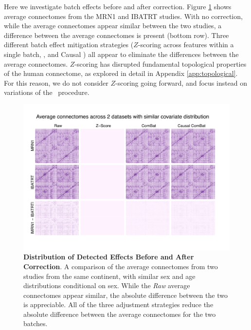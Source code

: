 {Here we investigate batch effects before and after correction. Figure  \ref{fig:site_hists} shows average connectomes from the MRN1 and IBATRT studies. With no correction, while the average connectomes appear similar between the two studies, a difference between the average connectomes is present (bottom row). Three different batch effect mitigation strategies ($Z$-scoring across features within a single batch, \Combat, and Causal \Combat) all appear to eliminate the differences between the average connectomes. $Z$-scoring has disrupted fundamental topological properties of the human connectome, as explored in detail in Appendix \ref{app:topological}. For this reason, we do not consider $Z$-scoring going forward, and focus instead on variations of the \Combat~procedure.

\begin{figure}[h!]
    \centering
    \includegraphics[width=.9\linewidth]{Figures/Content/site_effect_jk_2b.pdf}
    \caption{\textbf{Distribution of Detected Effects Before and After Correction}. A comparison of the average connectomes from two studies from the same continent, with similar sex and age distributions conditional on sex. While the \textit{Raw} average connectomes appear similar, the absolute difference between the two is appreciable. All of the three adjustment strategies reduce the absolute difference between the average connectomes for the two batches.}
    \label{fig:site_hists}
\end{figure}

}
